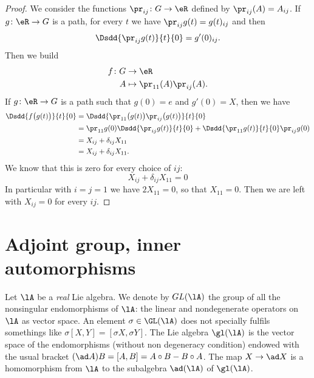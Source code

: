 \begin{proof}
    We consider the functions \( \pr_{ij}\colon G\to \eR\) defined by \( \pr_{ij}(A)=A_{ij}\). If \( g\colon \eR\to G\) is a path, for every \( t\) we have \( \pr_{ij}g(t)=g(t)_{ij}\) and then
    \begin{equation}
        \Dsdd{ \pr_{ij}g(t) }{t}{0}=g'(0)_{ij}.
    \end{equation}
    Then we build
    \begin{equation}
        \begin{aligned}
            f\colon G&\to \eR \\
            A&\mapsto \pr_{11}(A)\pr_{ij}(A). 
        \end{aligned}
    \end{equation}
    If \( g\colon \eR\to G\) is a path such that \( g(0)=e\) and \( g'(0)=X\), then we have
    \begin{subequations}
        \begin{align}
            \Dsdd{ f\big( g(t) \big) }{t}{0}&=\Dsdd{ \pr_{11}\big( g(t) \big)\pr_{ij}\big( g(t) \big) }{t}{0}\\
            &=\pr_{11}g(0)\Dsdd{ \pr_{ij}g(t) }{t}{0}+\Dsdd{ \pr_{11}g(t) }{t}{0}\pr_{ij}g(0)\\
            &=X_{ij}+\delta_{ij}X_{11}\\
            &=X_{ij}+\delta_{ij}X_{11}.
        \end{align}
    \end{subequations}
    We know that this is zero for every choice of \( ij\):
    \begin{equation}
        X_{ij}+\delta_{ij}X_{11}=0
    \end{equation}
    In particular with \( i=j=1\) we have \( 2X_{11}=0\), so that \( X_{11}=0\). Then we are left with \( X_{ij}=0\) for every \( ij\).
\end{proof}

\section{Adjoint group, inner automorphisms}\label{sec:adj_gp}

Let $\lA$ be a \emph{real} Lie algebra. We denote by $GL(\lA)$ the group of all the nonsingular endomorphisms of $\lA$: the linear and nondegenerate operators on $\lA$ as vector space. An element $\sigma\in\GL(\lA)$ does not specially fulfils somethings like $\sigma[X,Y]=[\sigma X,\sigma Y]$. The Lie algebra $\gl(\lA)$ is the vector space of the endomorphisms (without non degeneracy condition) endowed with the usual bracket $(\ad A)B=[A,B]=A\circ B-B\circ A$. The map $X\to\ad X$ is a homomorphism from $\lA$ to the subalgebra $\ad(\lA)$ of $\gl(\lA)$.

